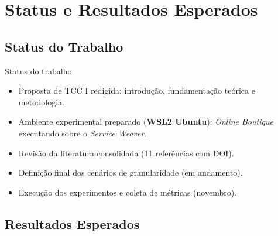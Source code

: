

\section[Status]{Status e Resultados Esperados}
\label{sec:resultados}

\subsection{Status do Trabalho}
\label{subsec:status}

\begin{frame}{Status do trabalho}
    \begin{itemize}
        \item[$\checkmark$] Proposta de TCC I redigida: introdução, fundamentação teórica e metodologia.
        \item[$\checkmark$] Ambiente experimental preparado (\textbf{WSL2 Ubuntu}): \textit{Online Boutique} executando sobre o \textit{Service Weaver}.
        \item[$\checkmark$] Revisão da literatura consolidada (11 referências com DOI).
        \item[{\textperiodcentered}] Definição final dos cenários de granularidade (em andamento).
        \item[{\textperiodcentered}] Execução dos experimentos e coleta de métricas (novembro).
    \end{itemize}
\end{frame}

\subsection{Resultados Esperados}
\label{subsec:resultados-esperados}

